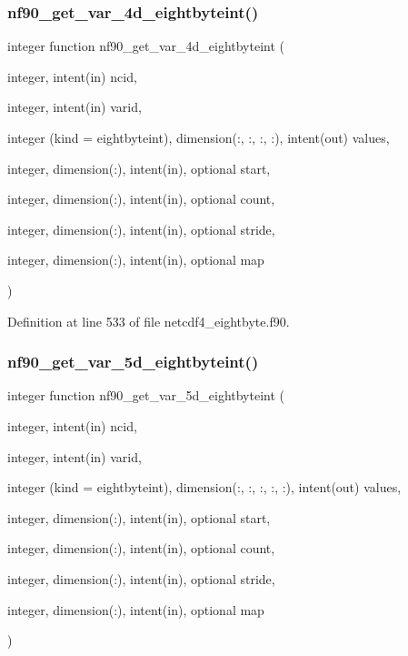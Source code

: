 \subsubsection{\texorpdfstring{nf90\+\_\+get\+\_\+var\+\_\+4d\+\_\+eightbyteint()}{nf90\_get\_var\_4d\_eightbyteint()}}
{\footnotesize\ttfamily integer function nf90\+\_\+get\+\_\+var\+\_\+4d\+\_\+eightbyteint (\begin{DoxyParamCaption}\item[{integer, intent(in)}]{ncid,  }\item[{integer, intent(in)}]{varid,  }\item[{integer (kind = eightbyteint), dimension(\+:, \+:, \+:, \+:), intent(out)}]{values,  }\item[{integer, dimension(\+:), intent(in), optional}]{start,  }\item[{integer, dimension(\+:), intent(in), optional}]{count,  }\item[{integer, dimension(\+:), intent(in), optional}]{stride,  }\item[{integer, dimension(\+:), intent(in), optional}]{map }\end{DoxyParamCaption})}



Definition at line 533 of file netcdf4\+\_\+eightbyte.\+f90.

\mbox{\label{netcdf4__eightbyte_8f90_aad2961aebfb639255928956049693640}} 
\subsubsection{\texorpdfstring{nf90\+\_\+get\+\_\+var\+\_\+5d\+\_\+eightbyteint()}{nf90\_get\_var\_5d\_eightbyteint()}}
{\footnotesize\ttfamily integer function nf90\+\_\+get\+\_\+var\+\_\+5d\+\_\+eightbyteint (\begin{DoxyParamCaption}\item[{integer, intent(in)}]{ncid,  }\item[{integer, intent(in)}]{varid,  }\item[{integer (kind = eightbyteint), dimension(\+:, \+:, \+:, \+:, \+:), intent(out)}]{values,  }\item[{integer, dimension(\+:), intent(in), optional}]{start,  }\item[{integer, dimension(\+:), intent(in), optional}]{count,  }\item[{integer, dimension(\+:), intent(in), optional}]{stride,  }\item[{integer, dimension(\+:), intent(in), optional}]{map }\end{DoxyParamCaption})}




